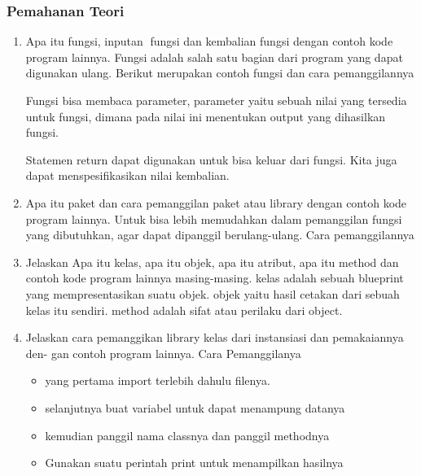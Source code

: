 \subsubsection{Pemahanan Teori}
\begin{enumerate}
    \item Apa itu fungsi, inputan fungsi dan kembalian fungsi dengan contoh kode program
    lainnya.
    Fungsi adalah salah satu bagian dari program yang dapat digunakan ulang.
    Berikut merupakan contoh fungsi dan cara pemanggilannya
    

    Fungsi bisa membaca parameter, parameter yaitu sebuah nilai yang tersedia untuk fungsi, dimana pada nilai ini menentukan output yang dihasilkan fungsi.
    

    Statemen return dapat digunakan untuk bisa keluar dari fungsi. Kita juga dapat menspesifikasikan nilai kembalian.
    

    \item Apa itu paket dan cara pemanggilan paket atau library dengan contoh kode
    program lainnya.
    Untuk bisa lebih memudahkan dalam pemanggilan fungsi yang dibutuhkan, agar dapat dipanggil berulang-ulang.
    Cara pemanggilannya
    

    \item Jelaskan Apa itu kelas, apa itu objek, apa itu atribut, apa itu method dan
    contoh kode program lainnya masing-masing.
    kelas adalah sebuah blueprint yang mempresentasikan suatu objek.
    objek yaitu hasil cetakan dari sebuah kelas itu sendiri.
    method adalah sifat atau perilaku dari object.
    

    \item Jelaskan cara pemanggikan library kelas dari instansiasi dan pemakaiannya den-
    gan contoh program lainnya.
    Cara Pemanggilanya
    \begin{itemize}
        \item yang pertama import terlebih dahulu filenya.
        \item selanjutnya buat variabel untuk dapat menampung datanya
        \item kemudian panggil nama classnya dan panggil methodnya
        \item Gunakan suatu perintah print untuk menampilkan hasilnya


\end{itemize}
\end{enumerate}
